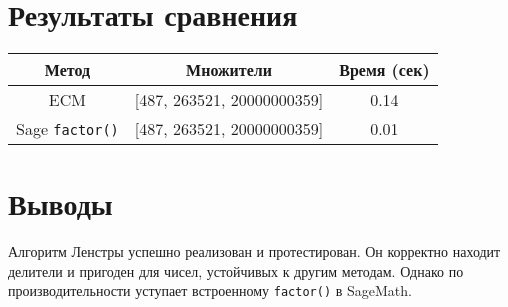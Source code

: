 \documentclass[12pt]{article}
\begin{document}
\section*{Результаты сравнения}

\begin{tabular}{|c|c|c|}
\hline
Метод & Множители & Время (сек) \\
\hline
ECM & [487, 263521, 20000000359] & 0.14 \\
\hline
Sage \texttt{factor()} & [487, 263521, 20000000359] & 0.01 \\
\hline
\end{tabular}

\section*{Выводы}
Алгоритм Ленстры успешно реализован и протестирован. Он корректно находит делители и пригоден для чисел, устойчивых к другим методам. Однако по производительности уступает встроенному \texttt{factor()} в SageMath.
\end{document}
